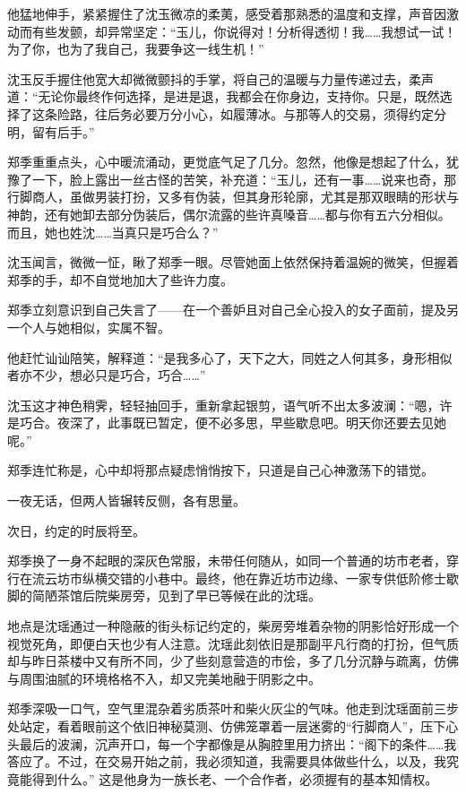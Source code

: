他猛地伸手，紧紧握住了沈玉微凉的柔荑，感受着那熟悉的温度和支撑，声音因激动而有些发颤，却异常坚定：“玉儿，你说得对！分析得透彻！我……我想试一试！为了你，也为了我自己，我要争这一线生机！”

沈玉反手握住他宽大却微微颤抖的手掌，将自己的温暖与力量传递过去，柔声道：“无论你最终作何选择，是进是退，我都会在你身边，支持你。只是，既然选择了这条险路，往后务必要万分小心，如履薄冰。与那等人的交易，须得约定分明，留有后手。”

郑季重重点头，心中暖流涌动，更觉底气足了几分。忽然，他像是想起了什么，犹豫了一下，脸上露出一丝古怪的苦笑，补充道：“玉儿，还有一事……说来也奇，那行脚商人，虽做男装打扮，又多有伪装，但其身形轮廓，尤其是那双眼睛的形状与神韵，还有她卸去部分伪装后，偶尔流露的些许真嗓音……都与你有五六分相似。而且，她也姓沈……当真只是巧合么？”

沈玉闻言，微微一怔，瞅了郑季一眼。尽管她面上依然保持着温婉的微笑，但握着郑季的手，却不自觉地加大了些许力度。

郑季立刻意识到自己失言了——在一个善妒且对自己全心投入的女子面前，提及另一个人与她相似，实属不智。

他赶忙讪讪陪笑，解释道：“是我多心了，天下之大，同姓之人何其多，身形相似者亦不少，想必只是巧合，巧合……”

沈玉这才神色稍霁，轻轻抽回手，重新拿起银剪，语气听不出太多波澜：“嗯，许是巧合。夜深了，此事既已暂定，便不必多思，早些歇息吧。明天你还要去见她呢。”

郑季连忙称是，心中却将那点疑虑悄悄按下，只道是自己心神激荡下的错觉。

一夜无话，但两人皆辗转反侧，各有思量。

\vspace{2em}

次日，约定的时辰将至。

郑季换了一身不起眼的深灰色常服，未带任何随从，如同一个普通的坊市老者，穿行在流云坊市纵横交错的小巷中。最终，他在靠近坊市边缘、一家专供低阶修士歇脚的简陋茶馆后院柴房旁，见到了早已等候在此的沈瑶。

地点是沈瑶通过一种隐蔽的街头标记约定的，柴房旁堆着杂物的阴影恰好形成一个视觉死角，即便白天也少有人注意。沈瑶此刻依旧是那副平凡行商的打扮，但气质却与昨日茶楼中又有所不同，少了些刻意营造的市侩，多了几分沉静与疏离，仿佛与周围油腻的环境格格不入，却又完美地融于阴影之中。

郑季深吸一口气，空气里混杂着劣质茶叶和柴火灰尘的气味。他走到沈瑶面前三步处站定，看着眼前这个依旧神秘莫测、仿佛笼罩着一层迷雾的“行脚商人”，压下心头最后的波澜，沉声开口，每一个字都像是从胸腔里用力挤出：“阁下的条件……我答应了。不过，在交易开始之前，我必须知道，我需要具体做些什么，以及，我究竟能得到什么。” 这是他身为一族长老、一个合作者，必须握有的基本知情权。

